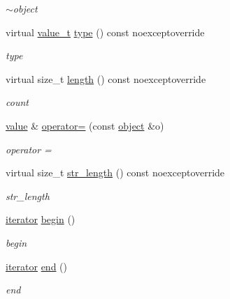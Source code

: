\begin{DoxyCompactItemize}
\begin{DoxyCompactList}\small\item\em $\sim$object \end{DoxyCompactList}\item 
virtual \hyperlink{classformat_1_1value_aa0334be06389a7b14af485fa0cd3aa21}{value\+\_\+t} \hyperlink{classformat_1_1object_aea7eb835fcbec62a85d078a7fa33cea7}{type} () const noexceptoverride
\begin{DoxyCompactList}\small\item\em type \end{DoxyCompactList}\item 
virtual size\+\_\+t \hyperlink{classformat_1_1object_a29be05a1b87c2d6263f15fc3280e3b6f}{length} () const noexceptoverride
\begin{DoxyCompactList}\small\item\em count \end{DoxyCompactList}\item 
\hyperlink{classformat_1_1value_aa6b85823936bf7b8ab78d3f8d443c00d}{value} \& \hyperlink{classformat_1_1object_a7df33aacd027ccfc4e710397142c7930}{operator=} (const \hyperlink{classformat_1_1object}{object} \&o)
\begin{DoxyCompactList}\small\item\em operator = \end{DoxyCompactList}\item 
virtual size\+\_\+t \hyperlink{classformat_1_1object_a866a470f6092172fcde8307882236a50}{str\+\_\+length} () const noexceptoverride
\begin{DoxyCompactList}\small\item\em str\+\_\+length \end{DoxyCompactList}\item 
\hyperlink{classformat_1_1object_1_1iterator}{iterator} \hyperlink{classformat_1_1object_aae71a75db823350a5a5e19899cd41f74}{begin} ()
\begin{DoxyCompactList}\small\item\em begin \end{DoxyCompactList}\item 
\hyperlink{classformat_1_1object_1_1iterator}{iterator} \hyperlink{classformat_1_1object_ad5c87c9101ca99c51fb19f4a81d1ab09}{end} ()
\begin{DoxyCompactList}\small\item\em end \end{DoxyCompactList}\end{DoxyCompactItemize}
